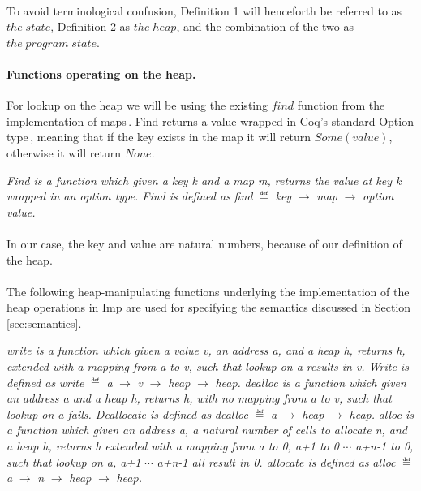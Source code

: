 \paragraph{} 
To avoid terminological confusion, Definition 1 will henceforth be referred to as $the\;state$, Definition 2 as $the\;heap$, and the combination of the two as $the\;program\;state$.

\paragraph{Functions operating on the heap.}
For lookup on the heap we will be using the existing $find$ function from the implementation of maps\,\cite{CoqContainers}. Find returns a value wrapped in Coq's standard Option type\,\cite{CoqOption}, meaning that if the key exists in the map it will return $Some(value)$, otherwise it will return $None$.

 \textit{Find is a function which given a key k and a map m, returns the value at key k wrapped in an option type. Find is defined as }{\it find} $\eqdef$ {\it key} $\to$ {\it map} $\to$ {\it option value.}

\paragraph{}
In our case, the key and value are natural numbers, because of our definition of the heap.
\paragraph{}
The following heap-manipulating functions underlying the implementation of the heap operations in Imp are used for specifying the semantics discussed in Section \ref{sec:semantics}.

\textit{write is a function which given a value v, an address a, and a heap h, returns h, extended with a mapping from a to v, such that lookup on a results in v. Write is defined as} {\it write} $\eqdef$ {\it a} $\to$ {\it v} $\to$ {\it heap} $\to$ {\it heap.}
 \textit{dealloc is a function which given an address a and a heap h, returns h, with no mapping from a to v, such that lookup on a fails. Deallocate is defined as }{\it dealloc} $\eqdef$ {\it a} $\to$ {\it heap} $\to$ {\it heap.}
 \textit{alloc is a function which given an address a, a natural number of cells to allocate n, and a heap h, returns h extended with a mapping from a to 0, a+1 to 0} $\cdots$ \textit{a+n-1 to 0, such that lookup on a, a+1} $\cdots$ \textit{a+n-1 all result in 0. allocate is defined as }{\it alloc} $\eqdef$ {\it a} $\to$ {\it n} $\to$ {\it heap} $\to$ {\it heap.}

